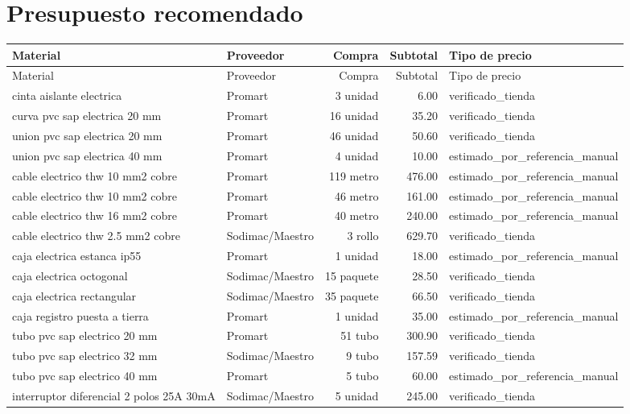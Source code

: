 \section{Presupuesto recomendado}
\begin{landscape}\scriptsize\begin{longtable}{p{8.0cm}p{3.2cm}r r p{4.0cm}}
\toprule Material & Proveedor & Compra & Subtotal & Tipo de precio \\ \midrule
\endfirsthead\toprule Material & Proveedor & Compra & Subtotal & Tipo de precio \\ \midrule\endhead
cinta aislante electrica & Promart & 3 unidad & 6.00 & verificado\_tienda \\
curva pvc sap electrica 20 mm & Promart & 16 unidad & 35.20 & verificado\_tienda \\
union pvc sap electrica 20 mm & Promart & 46 unidad & 50.60 & verificado\_tienda \\
union pvc sap electrica 40 mm & Promart & 4 unidad & 10.00 & estimado\_por\_referencia\_manual \\
cable electrico thw 10 mm2 cobre & Promart & 119 metro & 476.00 & estimado\_por\_referencia\_manual \\
cable electrico thw 10 mm2 cobre & Promart & 46 metro & 161.00 & estimado\_por\_referencia\_manual \\
cable electrico thw 16 mm2 cobre & Promart & 40 metro & 240.00 & estimado\_por\_referencia\_manual \\
cable electrico thw 2.5 mm2 cobre & Sodimac/Maestro & 3 rollo & 629.70 & verificado\_tienda \\
caja electrica estanca ip55 & Promart & 1 unidad & 18.00 & estimado\_por\_referencia\_manual \\
caja electrica octogonal & Sodimac/Maestro & 15 paquete & 28.50 & verificado\_tienda \\
caja electrica rectangular & Sodimac/Maestro & 35 paquete & 66.50 & verificado\_tienda \\
caja registro puesta a tierra & Promart & 1 unidad & 35.00 & estimado\_por\_referencia\_manual \\
tubo pvc sap electrico 20 mm & Promart & 51 tubo & 300.90 & verificado\_tienda \\
tubo pvc sap electrico 32 mm & Sodimac/Maestro & 9 tubo & 157.59 & verificado\_tienda \\
tubo pvc sap electrico 40 mm & Promart & 5 tubo & 60.00 & estimado\_por\_referencia\_manual \\
interruptor diferencial 2 polos 25A 30mA & Sodimac/Maestro & 5 unidad & 245.00 & verificado\_tienda \\

\end{longtable}
\end{landscape}
